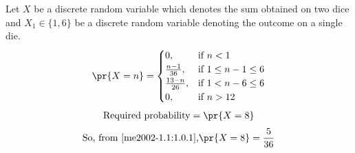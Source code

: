 Let $X$ be a discrete random variable which denotes the sum obtained on two dice and $X_{1} \in \{1,6\}$ be a discrete random variable denoting the outcome on a single die.
\begin{align}
\pr{X=n}=
\begin{cases}
 0 , &\text{if } n < 1 \\
 \frac{n-1}{36} , &\text{if } 1 \leq n-1 \leq 6\\
 \frac{13-n}{26} , &\text{if } 1 < n-6 \leq 6\\
 0 , &\text{if } n > 12 \label{me2002-1.1:1.0.1}
\end{cases}
\end{align}
\begin{align}
    \text{Required probability}  = \pr{X=8}  \notag 
\end{align}
\begin{align}
  \text{So, from \eqref{me2002-1.1:1.0.1},}  \pr{X=8}= \frac{5}{36} \notag
\end{align}